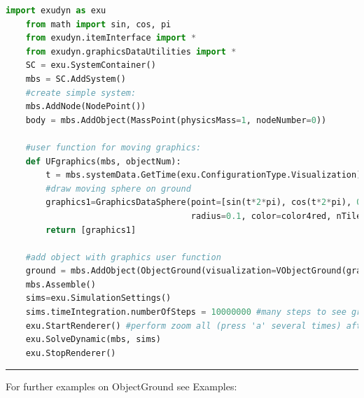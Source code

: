     \begin{lstlisting}[language=Python]
    import exudyn as exu
    from math import sin, cos, pi
    from exudyn.itemInterface import *
    from exudyn.graphicsDataUtilities import *
    SC = exu.SystemContainer()
    mbs = SC.AddSystem()
    #create simple system:
    mbs.AddNode(NodePoint())
    body = mbs.AddObject(MassPoint(physicsMass=1, nodeNumber=0))
    
    #user function for moving graphics:
    def UFgraphics(mbs, objectNum):
        t = mbs.systemData.GetTime(exu.ConfigurationType.Visualization) #get time if needed
        #draw moving sphere on ground
        graphics1=GraphicsDataSphere(point=[sin(t*2*pi), cos(t*2*pi), 0], 
                                     radius=0.1, color=color4red, nTiles=32)
        return [graphics1] 

    #add object with graphics user function
    ground = mbs.AddObject(ObjectGround(visualization=VObjectGround(graphicsDataUserFunction=UFgraphics)))
    mbs.Assemble()
    sims=exu.SimulationSettings()
    sims.timeIntegration.numberOfSteps = 10000000 #many steps to see graphics
    exu.StartRenderer() #perform zoom all (press 'a' several times) after startup to see the sphere
    exu.SolveDynamic(mbs, sims)
    exu.StopRenderer()
    \end{lstlisting}
\vspace{6pt}\par\noindent\rule{\textwidth}{0.4pt}
%
\noindent For further examples on ObjectGround see Examples:
\bi
